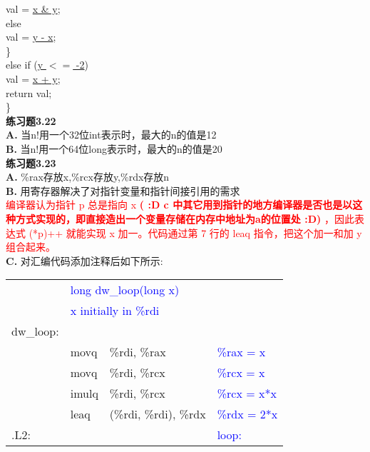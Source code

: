 \documentclass{article}
\newcommand{\blue}[1]{\textcolor{blue}{#1}}
\newcommand{\red}[1]{\textcolor{red}{#1}}
\begin{document}
\begin{CJK}{UTF8}{uyhei}
	\hspace*{6em}			val = \underline{x \& y};	\\
	\hspace*{4em}		else						\\
	\hspace*{6em}			val = \underline{y - x};	\\
	\hspace*{2em}	\}	\\
	\hspace*{2em}	else if (\underline{y $<=$ -2})			\\
	\hspace*{4em}		val = \underline{x + y};		\\
	\hspace*{2em}	return val;	\\
\}	\\[3ex]
\textbf{练习题3.22}	\\[1ex]
\textbf{A. }当n!用一个32位int表示时，最大的n的值是12	\\
\textbf{B. }当n!用一个64位long表示时，最大的n的值是20	\\[3ex]
\newpage
\noindent\textbf{练习题3.23}	\\[1ex]
\textbf{A. }\%rax存放x,\%rcx存放y,\%rdx存放n	\\
\textbf{B. }用寄存器解决了对指针变量和指针间接引用的需求	\\
\red{编译器认为指针 p 总是指向 x \textbf{( :D c 中其它用到指针的地方编译器是否也是以这种方式实现的，即直接造出一个变量存储在内存中地址为a的位置处 :D)} ，因此表达式 (*p)++ 就能实现 x 加一。代码通过第 7 行的 leaq 指令，把这个加一和加 y 组合起来。}	\\
\textbf{C. }对汇编代码添加注释后如下所示:	\\[-4ex]
\begin{table}[htbp]
\begin{tabular}{m{1em}m{3em}m{12em}l}
		&	\multicolumn{2}{l}{\blue{long dw\_loop(long x)}}	&	\\
		&	\multicolumn{2}{l}{\blue{x initially in \%rdi}}	&	\\
	dw\_loop:	\\
	&	movq	&	\%rdi, \%rax	&	\blue{\%rax = x}	\\
	&	movq	&	\%rdi, \%rcx	&	\blue{\%rcx = x}	\\
	&	imulq	&	\%rdi, \%rcx	&	\blue{\%rcx = x*x}	\\
	&	leaq	&	(\%rdi, \%rdi), \%rdx	&	\blue{\%rdx = 2*x}	\\
	.L2:	&	&			&	\blue{loop:}	\\

\end{tabular}
\end{table}
\end{CJK}
\end{document}
